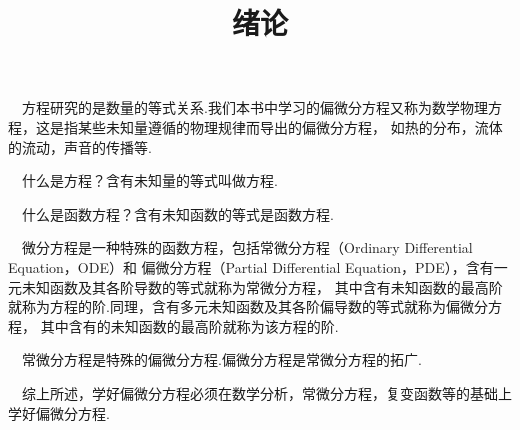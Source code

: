 \documentclass[UTF8]{ctexart}
\title{绪论}
\date{}
\begin{document}
    \maketitle 
    ~~方程研究的是数量的等式关系.我们本书中学习的偏微分方程又称为数学物理方程，这是指某些未知量遵循的物理规律而导出的偏微分方程，
    如热的分布，流体的流动，声音的传播等.

~~什么是方程？含有未知量的等式叫做方程.

~~什么是函数方程？含有未知函数的等式是函数方程.

~~微分方程是一种特殊的函数方程，包括常微分方程（Ordinary Differential Equation，ODE）和
偏微分方程（Partial Differential Equation，PDE），含有一元未知函数及其各阶导数的等式就称为常微分方程，
其中含有未知函数的最高阶就称为方程的阶.同理，含有多元未知函数及其各阶偏导数的等式就称为偏微分方程，
其中含有的未知函数的最高阶就称为该方程的阶.

~~常微分方程是特殊的偏微分方程.偏微分方程是常微分方程的拓广.

~~综上所述，学好偏微分方程必须在数学分析，常微分方程，复变函数等的基础上学好偏微分方程.
\end{document}
